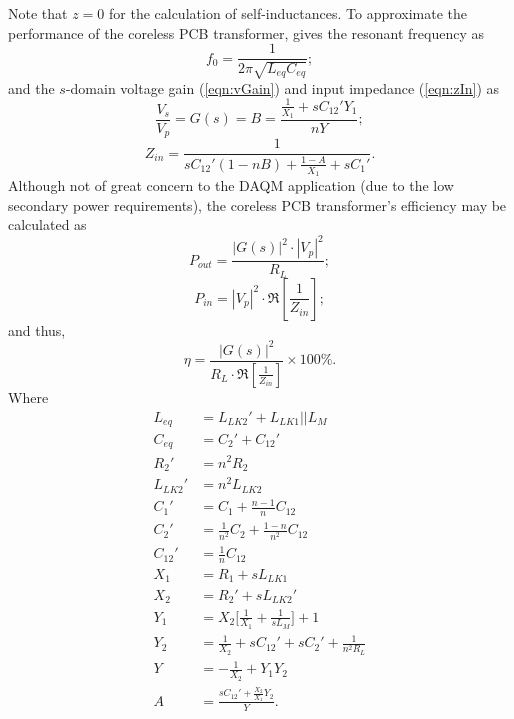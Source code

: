 \documentclass[conference]{IEEEtran}
\begin{document}
\hspace{-15pt}Note that $z = 0$ for the calculation of self-inductances. 
To approximate the performance of the coreless PCB transformer, \cite{TangHuiFundamental} gives the resonant frequency as
%
\begin{equation}
	f_{0} = \frac{1}{2\pi\sqrt{L_{eq}C_{eq}}};
\end{equation}
%
and the $s$-domain voltage gain (\ref{eqn:vGain}) and input impedance (\ref{eqn:zIn}) as
%
\begin{equation}
	\label{eqn:vGain}
	\frac{V_{s}}{V_{p}} = G(s) = B = \frac{\frac{1}{X_{1}}+sC_{12}'Y_{1}}{nY};
\end{equation}
%
\begin{equation}
	\label{eqn:zIn}
	Z_{in} = \frac{1}{sC_{12}'(1-nB)+\frac{1-A}{X_{1}}+sC_{1}'}.
\end{equation}
%
Although not of great concern to the DAQM application (due to the low secondary power requirements), the coreless PCB transformer's efficiency \cite{TangHuiFundamental} may be calculated as
\begin{equation}
	P_{out} = \frac{|G(s)|^{2}\cdot|V_{p}|^{2}}{R_{L}};
\end{equation}
\begin{equation}
	P_{in} = |V_{p}|^{2}\cdot\Re \left[ \frac{1}{Z_{in}} \right];
\end{equation}
and thus,
\begin{equation}
	\eta = \frac{|G(s)|^{2}}{R_{L}\cdot\Re \left[ \frac{1}{Z_{in}} \right]}\times 100 \%.
\end{equation}
%
Where
\vspace{-5pt}
\begin{align*}
	L_{eq}   &= L_{LK2}'+L_{LK1}||L_{M} 	\\
	C_{eq}   &= C_{2}'+C_{12}'				\\
	R_{2}'   &= n^{2}R_{2}					\\
	L_{LK2}' &= n^{2}L_{LK2}				\\
	C_{1}'   &= C_{1} + \frac{n-1}{n}C_{12}	\\
	C_{2}'   &= \frac{1}{n^{2}}C_{2} + \frac{1-n}{n^{2}}C_{12}	\\
	C_{12}'  &= \frac{1}{n}C_{12}			\\
	X_{1}    &= R_{1}  + sL_{LK1}			\\
	X_{2}    &= R_{2}' + sL_{LK2}'			\\
	Y_{1}    &= X_{2} \lbrack \frac{1}{X_{1}} + \frac{1}{sL_{M}} \rbrack +1	\\
	Y_{2}    &= \frac{1}{X_{2}} + sC_{12}' + sC_{2}' + \frac{1}{n^{2}R_{L}}	\\
	Y        &= -\frac{1}{X_{2}} + Y_{1}Y_{2}	\\
	A        &= \frac{sC_{12}' + \frac{X_{2}}{X_{1}} Y_{2}}{Y}.
\end{align*}
%
\end{document}
